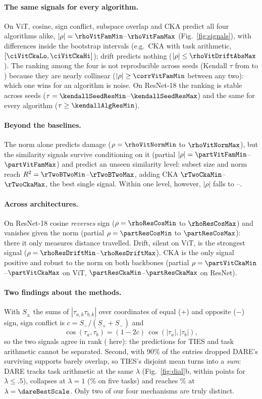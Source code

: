 \documentclass{article}
\begin{document}
\paragraph{The same signals for every algorithm.} On ViT, cosine, sign conflict, subspace overlap and CKA predict all four algorithms alike, $|\rho| = \rhoVitFamMin$--$\rhoVitFamMax$ (Fig.~\ref{fig:signals}), with differences inside the bootstrap intervals (e.g.\ CKA with task arithmetic, $[\ciVitCkaLo, \ciVitCkaHi]$); drift predicts nothing ($|\rho| \le \rhoVitDriftAbsMax$). The ranking among the four is not reproducible across seeds (Kendall $\tau$ from \kendallSeedVitMin{} to \kendallSeedVitMax) because they are nearly collinear ($|\rho| \ge \corrVitFamMin$ between any two): which one wins for an algorithm is noise. On ResNet-18 the ranking is stable across seeds ($\tau = \kendallSeedResMin$--$\kendallSeedResMax$) and the same for every algorithm ($\tau \ge \kendallAlgResMin$).

\paragraph{Beyond the baselines.} The norm alone predicts damage ($\rho = \rhoVitNormMin$ to $\rhoVitNormMax$), but the similarity signals survive conditioning on it (partial $|\rho| = \partVitFamMin$--$\partVitFamMax$) and predict an unseen similarity level: subset size and norm reach $R^2 = \rTwoBTwoMin$--$\rTwoBTwoMax$, adding CKA $\rTwoCkaMin$--$\rTwoCkaMax$, the best single signal. Within one level, however, $|\rho|$ falls to \rhoVitWithinMin--\rhoVitWithinMax.

\paragraph{Across architectures.} On ResNet-18 cosine \emph{reverses} sign ($\rho = \rhoResCosMin$ to $\rhoResCosMax$) and vanishes given the norm (partial $\rho = \partResCosMin$ to $\partResCosMax$): there it only measures distance travelled. Drift, silent on ViT, is the strongest signal ($\rho = \rhoResDriftMin$--$\rhoResDriftMax$). CKA is the only signal positive and robust to the norm on both backbones (partial $\rho = \partVitCkaMin$--$\partVitCkaMax$ on ViT, $\partResCkaMin$--$\partResCkaMax$ on ResNet).

\paragraph{Two findings about the methods.} With $S_\pm$ the sums of $|\tau_{a,k}\tau_{b,k}|$ over coordinates of equal ($+$) and opposite ($-$) sign, sign conflict is $c = S_-/(S_+ + S_-)$ and
\[
\cos(\tau_a, \tau_b) = (1 - 2c)\,\cos(|\tau_a|, |\tau_b|),
\]
so the two signals agree in rank (\corrCosSignVit{} here): the predictions for TIES and task arithmetic cannot be separated. Second, with 90\% of the entries dropped DARE's surviving supports barely overlap, so TIES's disjoint mean turns into a \emph{sum}: DARE tracks task arithmetic at the same $\lambda$ (Fig.~\ref{fig:dial}b, within \dareTaGapMax{} points for $\lambda \le .5$), collapses at $\lambda = 1$ (\dareOneFive\% on five tasks) and reaches \dareBestFive\% at $\lambda = \dareBestScale$. Only two of our four mechanisms are truly distinct.
\end{document}
